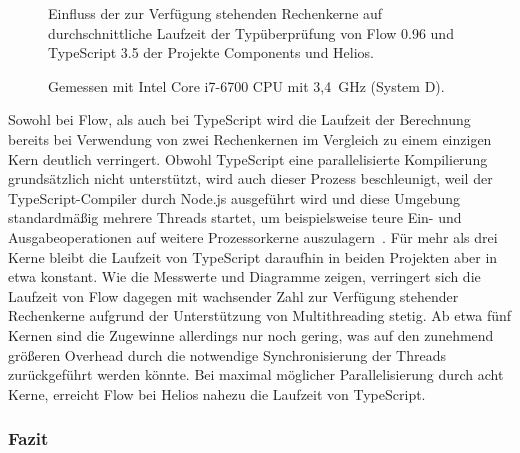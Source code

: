 \medbreak


\begin{figure}[p]
  \centering

  

  \vspace{.5\baselineskip}

  
  \vspace{.5\baselineskip}
  \caption[Einfluss der zur Verfügung stehenden Rechenkerne auf durchschnittliche Laufzeit der Typüberprüfung von Flow und TypeScript]{
    Einfluss der zur Verfügung stehenden Rechenkerne auf durchschnittliche Laufzeit der Typüberprüfung von Flow 0.96 und TypeScript 3.5 der Projekte Components und Helios.
  }

  \vspace{\baselineskip}
  \caption*{
    \small
    Gemessen mit Intel Core i7-6700 CPU mit 3,4~GHz (System D).
  }

  \label{fig:plot-cores}
\end{figure}

Sowohl bei Flow, als auch bei TypeScript wird die Laufzeit der Berechnung bereits bei Verwendung von zwei Rechenkernen im Vergleich zu einem einzigen Kern deutlich verringert. Obwohl TypeScript eine parallelisierte Kompilierung grundsätzlich nicht unterstützt, wird auch dieser Prozess beschleunigt, weil der TypeScript-Compiler durch Node.js ausgeführt wird und diese Umgebung standardmäßig mehrere Threads startet, um beispielsweise teure Ein- und Ausgabeoperationen auf weitere Prozessorkerne auszulagern~\autocite{NODE:THREADS}. Für mehr als drei Kerne bleibt die Laufzeit von TypeScript daraufhin in beiden Projekten aber in etwa konstant. Wie die Messwerte und Diagramme zeigen, verringert sich die Laufzeit von Flow dagegen mit wachsender Zahl zur Verfügung stehender Rechenkerne aufgrund der Unterstützung von Multithreading stetig. Ab etwa fünf Kernen sind die Zugewinne allerdings nur noch gering, was auf den zunehmend größeren Overhead durch die notwendige Synchronisierung der Threads zurückgeführt werden könnte. Bei maximal möglicher Parallelisierung durch acht Kerne, erreicht Flow bei Helios nahezu die Laufzeit von TypeScript.

\subsubsection{Fazit}

